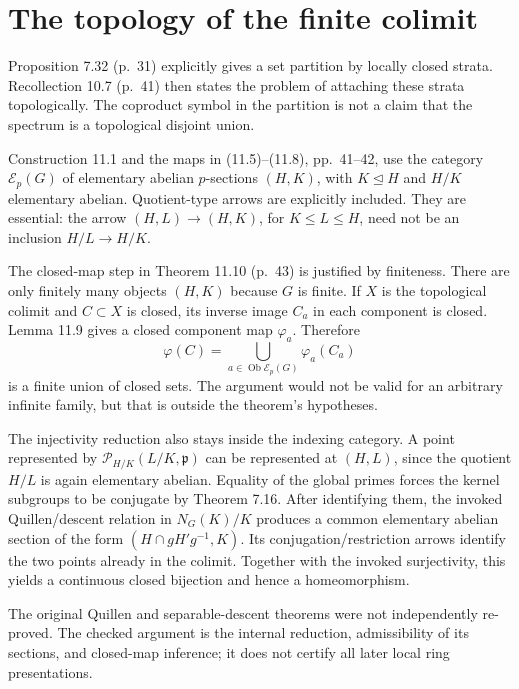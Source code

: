 \documentclass[10pt]{article}
\begin{document}
\section*{The topology of the finite colimit}
Proposition 7.32 (p. 31) explicitly gives a set partition by locally closed strata. Recollection 10.7 (p. 41) then states the problem of attaching these strata topologically. The coproduct symbol in the partition is not a claim that the spectrum is a topological disjoint union.\par
Construction 11.1 and the maps in (11.5)–(11.8), pp. 41–42, use the category \(\mathcal E_p(G)\) of elementary abelian \(p\)-sections \((H,K)\), with \(K\trianglelefteq H\) and \(H/K\) elementary abelian. Quotient-type arrows are explicitly included. They are essential: the arrow \((H,L)\to(H,K)\), for \(K\le L\le H\), need not be an inclusion \(H/L\to H/K\).\par
The closed-map step in Theorem 11.10 (p. 43) is justified by finiteness. There are only finitely many objects \((H,K)\) because \(G\) is finite. If \(X\) is the topological colimit and \(C\subset X\) is closed, its inverse image \(C_a\) in each component is closed. Lemma 11.9 gives a closed component map \(\varphi_a\). Therefore \[\varphi(C)=\bigcup_{a\in\operatorname{Ob}\mathcal E_p(G)}\varphi_a(C_a)\] is a finite union of closed sets. The argument would not be valid for an arbitrary infinite family, but that is outside the theorem’s hypotheses.\par
The injectivity reduction also stays inside the indexing category. A point represented by \(\mathcal P_{H/K}(L/K,\mathfrak p)\) can be represented at \((H,L)\), since the quotient \(H/L\) is again elementary abelian. Equality of the global primes forces the kernel subgroups to be conjugate by Theorem 7.16. After identifying them, the invoked Quillen/descent relation in \(N_G(K)/K\) produces a common elementary abelian section of the form \((H\cap gH'g^{-1},K)\). Its conjugation/restriction arrows identify the two points already in the colimit. Together with the invoked surjectivity, this yields a continuous closed bijection and hence a homeomorphism.\par
The original Quillen and separable-descent theorems were not independently re-proved. The checked argument is the internal reduction, admissibility of its sections, and closed-map inference; it does not certify all later local ring presentations.\par
\end{document}
